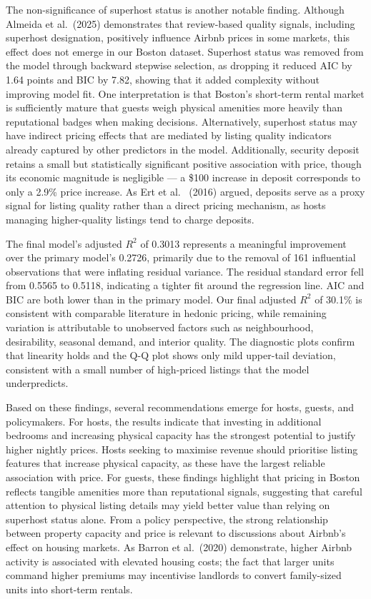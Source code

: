 \documentclass[
]{article}
\begin{document}
The non-significance of superhost status is another notable finding.
Although Almeida et al.~(2025) demonstrates that review-based quality
signals, including superhost designation, positively influence Airbnb
prices in some markets, this effect does not emerge in our Boston
dataset. Superhost status was removed from the model through backward
stepwise selection, as dropping it reduced AIC by 1.64 points and BIC by
7.82, showing that it added complexity without improving model fit. One
interpretation is that Boston's short-term rental market is sufficiently
mature that guests weigh physical amenities more heavily than
reputational badges when making decisions. Alternatively, superhost
status may have indirect pricing effects that are mediated by listing
quality indicators already captured by other predictors in the model.
Additionally, security deposit retains a small but statistically
significant positive association with price, though its economic
magnitude is negligible --- a \$100 increase in deposit corresponds to
only a 2.9\% price increase. As Ert et al.~ (2016) argued, deposits
serve as a proxy signal for listing quality rather than a direct pricing
mechanism, as hosts managing higher-quality listings tend to charge
deposits.

The final model's adjusted \(R^2\) of 0.3013 represents a meaningful
improvement over the primary model's 0.2726, primarily due to the
removal of 161 influential observations that were inflating residual
variance. The residual standard error fell from 0.5565 to 0.5118,
indicating a tighter fit around the regression line. AIC and BIC are
both lower than in the primary model. Our final adjusted \(R^2\) of
30.1\% is consistent with comparable literature in hedonic pricing,
while remaining variation is attributable to unobserved factors such as
neighbourhood, desirability, seasonal demand, and interior quality. The
diagnostic plots confirm that linearity holds and the Q-Q plot shows
only mild upper-tail deviation, consistent with a small number of
high-priced listings that the model underpredicts.

Based on these findings, several recommendations emerge for hosts,
guests, and policymakers. For hosts, the results indicate that investing
in additional bedrooms and increasing physical capacity has the
strongest potential to justify higher nightly prices. Hosts seeking to
maximise revenue should prioritise listing features that increase
physical capacity, as these have the largest reliable association with
price. For guests, these findings highlight that pricing in Boston
reflects tangible amenities more than reputational signals, suggesting
that careful attention to physical listing details may yield better
value than relying on superhost status alone. From a policy perspective,
the strong relationship between property capacity and price is relevant
to discussions about Airbnb's effect on housing markets. As Barron et
al.~(2020) demonstrate, higher Airbnb activity is associated with
elevated housing costs; the fact that larger units command higher
premiums may incentivise landlords to convert family-sized units into
short-term rentals.
\end{document}
